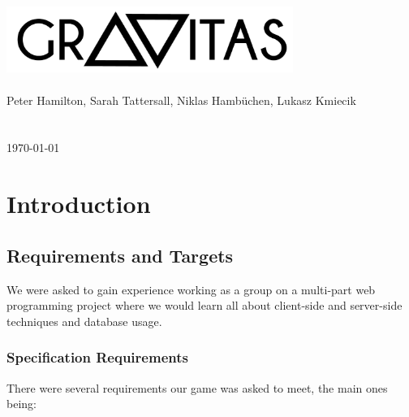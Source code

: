 \documentclass[a4wide, 11pt]{article}
\begin{document}
\title{}

\author{}

\date{\today}         %

\begin{center}
  \ \\
  \ \\
  \ \\
  \ \\
  \ \\
  \ \\
  \ \\
  \ \\
\includegraphics[width=0.7\textwidth]{images/logo.png} \\ \ \\
Peter Hamilton, Sarah Tattersall, Niklas Hamb\"{u}chen, Lukasz Kmiecik
\ \\
\ \\
\ \\
\today
\end{center}
\pagebreak

\tableofcontents

\pagebreak

\section{Introduction}
\subsection{Requirements and Targets}
We were asked to gain experience working as a group on a multi-part web programming project where we would learn all about client-side and server-side techniques and database usage.

\subsubsection{Specification Requirements}
There were several requirements our game was asked to meet, the main ones being:
\end{document}
